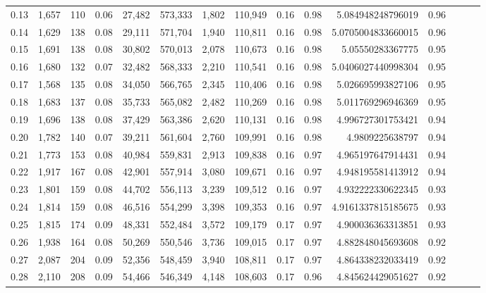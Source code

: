 \begin{tabular}{rrrrrrrrrrrrrrr}
0.13 &   1,657 &    110 &  0.06 &   27,482 &  573,333 &    1,802 &  110,949 &  0.16 &  0.98 &     5.084948248796019 &      0.96 \\
0.14 &   1,629 &    138 &  0.08 &   29,111 &  571,704 &    1,940 &  110,811 &  0.16 &  0.98 &    5.0705004833660015 &      0.96 \\
0.15 &   1,691 &    138 &  0.08 &   30,802 &  570,013 &    2,078 &  110,673 &  0.16 &  0.98 &      5.05550283367775 &      0.95 \\
0.16 &   1,680 &    132 &  0.07 &   32,482 &  568,333 &    2,210 &  110,541 &  0.16 &  0.98 &    5.0406027440998304 &      0.95 \\
0.17 &   1,568 &    135 &  0.08 &   34,050 &  566,765 &    2,345 &  110,406 &  0.16 &  0.98 &     5.026695993827106 &      0.95 \\
0.18 &   1,683 &    137 &  0.08 &   35,733 &  565,082 &    2,482 &  110,269 &  0.16 &  0.98 &     5.011769296946369 &      0.95 \\
0.19 &   1,696 &    138 &  0.08 &   37,429 &  563,386 &    2,620 &  110,131 &  0.16 &  0.98 &     4.996727301753421 &      0.94 \\
0.20 &   1,782 &    140 &  0.07 &   39,211 &  561,604 &    2,760 &  109,991 &  0.16 &  0.98 &       4.9809225638797 &      0.94 \\
0.21 &   1,773 &    153 &  0.08 &   40,984 &  559,831 &    2,913 &  109,838 &  0.16 &  0.97 &     4.965197647914431 &      0.94 \\
0.22 &   1,917 &    167 &  0.08 &   42,901 &  557,914 &    3,080 &  109,671 &  0.16 &  0.97 &     4.948195581413912 &      0.94 \\
0.23 &   1,801 &    159 &  0.08 &   44,702 &  556,113 &    3,239 &  109,512 &  0.16 &  0.97 &     4.932222330622345 &      0.93 \\
0.24 &   1,814 &    159 &  0.08 &   46,516 &  554,299 &    3,398 &  109,353 &  0.16 &  0.97 &    4.9161337815185675 &      0.93 \\
0.25 &   1,815 &    174 &  0.09 &   48,331 &  552,484 &    3,572 &  109,179 &  0.17 &  0.97 &     4.900036363313851 &      0.93 \\
0.26 &   1,938 &    164 &  0.08 &   50,269 &  550,546 &    3,736 &  109,015 &  0.17 &  0.97 &     4.882848045693608 &      0.92 \\
0.27 &   2,087 &    204 &  0.09 &   52,356 &  548,459 &    3,940 &  108,811 &  0.17 &  0.97 &     4.864338232033419 &      0.92 \\
0.28 &   2,110 &    208 &  0.09 &   54,466 &  546,349 &    4,148 &  108,603 &  0.17 &  0.96 &     4.845624429051627 &      0.92 \\

\end{tabular}
